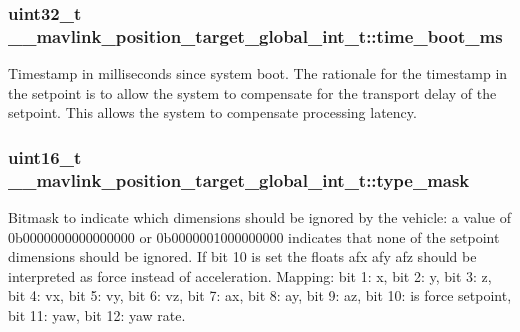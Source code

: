 \hypertarget{struct____mavlink__position__target__global__int__t_a4185bd4eabe762366b18c8988eaf1ec2}{
\subsubsection[{time\+\_\+boot\+\_\+ms}]{\setlength{\rightskip}{0pt plus 5cm}uint32\+\_\+t \+\_\+\+\_\+mavlink\+\_\+position\+\_\+target\+\_\+global\+\_\+int\+\_\+t\+::time\+\_\+boot\+\_\+ms}}\label{struct____mavlink__position__target__global__int__t_a4185bd4eabe762366b18c8988eaf1ec2}


Timestamp in milliseconds since system boot. The rationale for the timestamp in the setpoint is to allow the system to compensate for the transport delay of the setpoint. This allows the system to compensate processing latency. 

\hypertarget{struct____mavlink__position__target__global__int__t_a62c3974a44a8f2c189ed1cbf3b7536d6}{
\subsubsection[{type\+\_\+mask}]{\setlength{\rightskip}{0pt plus 5cm}uint16\+\_\+t \+\_\+\+\_\+mavlink\+\_\+position\+\_\+target\+\_\+global\+\_\+int\+\_\+t\+::type\+\_\+mask}}\label{struct____mavlink__position__target__global__int__t_a62c3974a44a8f2c189ed1cbf3b7536d6}


Bitmask to indicate which dimensions should be ignored by the vehicle\+: a value of 0b0000000000000000 or 0b0000001000000000 indicates that none of the setpoint dimensions should be ignored. If bit 10 is set the floats afx afy afz should be interpreted as force instead of acceleration. Mapping\+: bit 1\+: x, bit 2\+: y, bit 3\+: z, bit 4\+: vx, bit 5\+: vy, bit 6\+: vz, bit 7\+: ax, bit 8\+: ay, bit 9\+: az, bit 10\+: is force setpoint, bit 11\+: yaw, bit 12\+: yaw rate. 


